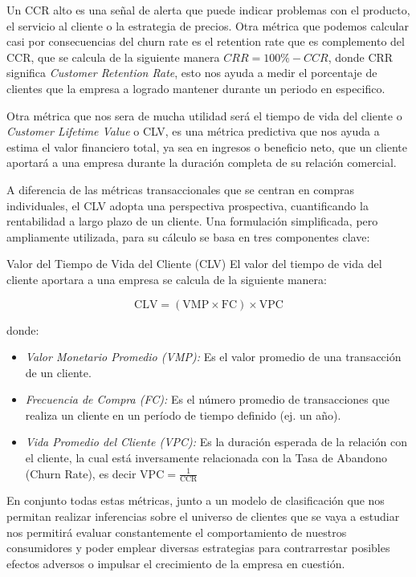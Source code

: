 Un CCR alto es una señal de alerta que puede indicar problemas con el producto, el servicio al cliente o la estrategia de precios. Otra métrica que podemos calcular casi por consecuencias del churn rate es el retention rate que es complemento del CCR, que se calcula de la siguiente manera $CRR=100\%-CCR$, donde CRR significa \textit{Customer Retention Rate}, esto nos ayuda a medir el porcentaje de clientes que la empresa a logrado mantener durante un periodo en especifico.

Otra métrica que nos sera de mucha utilidad será el tiempo de vida del cliente o \textit{Customer Lifetime Value} o CLV, es una métrica predictiva que nos ayuda a estima el valor financiero total, ya sea en ingresos o beneficio neto, que un cliente aportará a una empresa durante la duración completa de su relación comercial.

A diferencia de las métricas transaccionales que se centran en compras individuales, el CLV adopta una perspectiva prospectiva, cuantificando la rentabilidad a largo plazo de un cliente. Una formulación simplificada, pero ampliamente utilizada, para su cálculo se basa en tres componentes clave:

\begin{definicion}{Valor del Tiempo de Vida del Cliente (CLV)}
	El valor del tiempo de vida del cliente aportara a una empresa se calcula de la siguiente manera:
	
	\[
	\text{CLV} = (\text{VMP} \times \text{FC}) \times \text{VPC}
	\]
	
	donde:
	\begin{itemize}
		\item \textit{Valor Monetario Promedio (VMP):} Es el valor promedio de una transacción de un cliente.
		\item \textit{Frecuencia de Compra (FC):} Es el número promedio de transacciones que realiza un cliente en un período de tiempo definido (ej. un año).
		\item \textit{Vida Promedio del Cliente (VPC):} Es la duración esperada de la relación con el cliente, la cual está inversamente relacionada con la Tasa de Abandono (Churn Rate), es decir $\text{VPC} = \frac{1}{\text{CCR}}$
	\end{itemize}
\end{definicion}

En conjunto todas estas métricas, junto a un modelo de clasificación que nos permitan realizar inferencias sobre el universo de clientes que se vaya a estudiar nos permitirá evaluar constantemente el comportamiento de nuestros consumidores y poder emplear diversas estrategias para contrarrestar posibles efectos adversos o impulsar el crecimiento de la empresa en cuestión.

